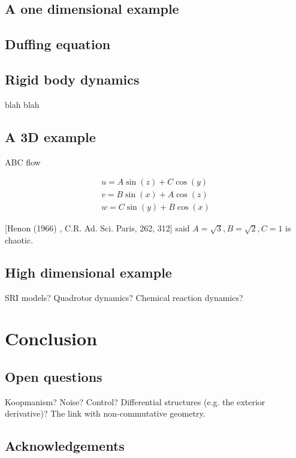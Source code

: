 \documentclass[12pt]{amsart}
\begin{document}
\subsection{A one dimensional example}

\subsection{Duffing equation}

\subsection{Rigid body dynamics}
blah blah

\subsection{A 3D example}
ABC flow

\begin{align*}
	u = A \sin(z) + C \cos(y) \\
	v = B \sin(x) + A \cos(z) \\
	w = C \sin(y) + B \cos(x)
\end{align*}

[Henon (1966) , C.R. Ad. Sci. Paris, 262, 312]
said $A = \sqrt{3},B = \sqrt{2},C=1$ is chaotic.

\subsection{High dimensional example}
SRI models?  Quadrotor dynamics?  Chemical reaction dynamics?

\section{Conclusion}

\subsection{Open questions}
Koopmanism?  Noise?  Control?  Differential structures (e.g. the exterior derivative)?  The link with non-commutative geometry.

\subsection{Acknowledgements}



\end{document}

